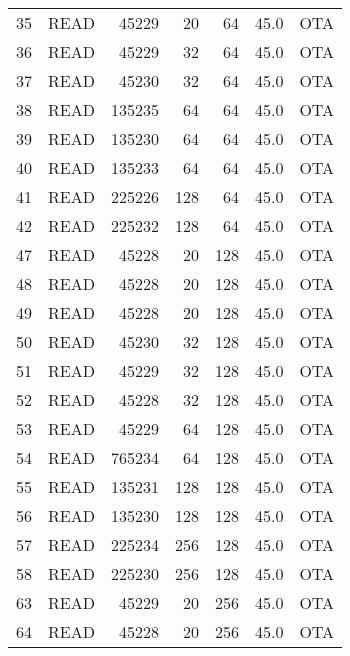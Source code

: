 \begin{longtable}{llrrrrl}
35  &         READ &     45229 &         20 &        64 &           45.0 &  OTA \\
36  &         READ &     45229 &         32 &        64 &           45.0 &  OTA \\
37  &         READ &     45230 &         32 &        64 &           45.0 &  OTA \\
38  &         READ &    135235 &         64 &        64 &           45.0 &  OTA \\
39  &         READ &    135230 &         64 &        64 &           45.0 &  OTA \\
40  &         READ &    135233 &         64 &        64 &           45.0 &  OTA \\
41  &         READ &    225226 &        128 &        64 &           45.0 &  OTA \\
42  &         READ &    225232 &        128 &        64 &           45.0 &  OTA \\
47  &         READ &     45228 &         20 &       128 &           45.0 &  OTA \\
48  &         READ &     45228 &         20 &       128 &           45.0 &  OTA \\
49  &         READ &     45228 &         20 &       128 &           45.0 &  OTA \\
50  &         READ &     45230 &         32 &       128 &           45.0 &  OTA \\
51  &         READ &     45229 &         32 &       128 &           45.0 &  OTA \\
52  &         READ &     45228 &         32 &       128 &           45.0 &  OTA \\
53  &         READ &     45229 &         64 &       128 &           45.0 &  OTA \\
54  &         READ &    765234 &         64 &       128 &           45.0 &  OTA \\
55  &         READ &    135231 &        128 &       128 &           45.0 &  OTA \\
56  &         READ &    135230 &        128 &       128 &           45.0 &  OTA \\
57  &         READ &    225234 &        256 &       128 &           45.0 &  OTA \\
58  &         READ &    225230 &        256 &       128 &           45.0 &  OTA \\
63  &         READ &     45229 &         20 &       256 &           45.0 &  OTA \\
64  &         READ &     45228 &         20 &       256 &           45.0 &  OTA \\

\end{longtable}
